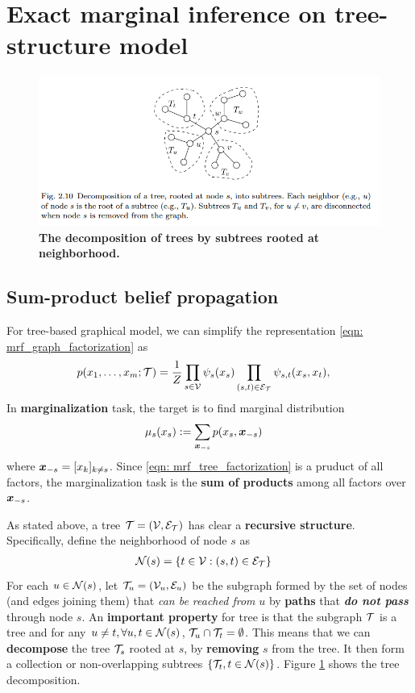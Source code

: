 \documentclass[11pt]{article}
\begin{document}
\section{Exact marginal inference on tree-structure model}
\begin{figure}
\begin{minipage}[t]{1\linewidth}
  \centering
  \centerline{\includegraphics[scale = 0.5]{tree_decomp.png}}
\end{minipage}
\caption{\footnotesize{\textbf{The decomposition of trees by subtrees rooted at neighborhood.}}}
\label{fig: tree_decomp}
\end{figure}
\subsection{Sum-product belief propagation}
For tree-based graphical model, we can simplify the representation \eqref{eqn: mrf_graph_factorization} as
\begin{align}
p(x_1, \ldots, x_{m}; {\mathcal T}) &= \frac{1}{Z}\prod_{s\in {\mathcal V}}\psi_{s}(x_{s})\prod_{(s,t) \in {\mathcal E}_{{\mathcal T}}}\psi_{s,t}(x_{s}, x_{t}), \label{eqn: mrf_tree_factorization}
\end{align} In \textbf{marginalization} task, the target is to find marginal distribution
\begin{align}
\mu_{s}(x_{s}) &:= \sum_{\boldsymbol{x}_{-s}}p(x_s, \boldsymbol{x}_{-s}) \label{eqn: mrf_tree_marginal}
\end{align} where $\boldsymbol{x}_{-s} = [x_k]_{k\neq s}$. Since \eqref{eqn: mrf_tree_factorization} is a pruduct of all factors, the marginalization task is the \textbf{sum of products} among all factors over $\boldsymbol{x}_{-s}$.


As stated above, a tree ${\mathcal T} = ({\mathcal V}, {\mathcal E}_{{\mathcal T}})$ has clear a \textbf{recursive structure}. Specifically, define the neighborhood of node $s$ as
\begin{align*}
{\mathcal N}(s) &= \left\{t\in {\mathcal V}: (s,t) \in {\mathcal E}_{{\mathcal T}} \right\}
\end{align*} For each $u \in {\mathcal N}(s)$, let ${\mathcal T}_u = ({\mathcal V}_u, {\mathcal E}_u)$ be the subgraph formed by the set of nodes (and edges joining them) that \emph{can be reached from} $u$ by \textbf{paths} that \emph{\textbf{do not pass}} through node $s$. An \textbf{important property} for tree is that the subgraph ${\mathcal T}$ is a tree and  for any $u\neq t,  \forall u,t \in {\mathcal N}(s)$, ${\mathcal T}_{u} \cap {\mathcal T}_{t} = \emptyset$.  This means that we can \textbf{decompose} the tree ${\mathcal T}_{s}$ rooted at $s$, by \textbf{removing} $s$ from the tree. It then form a collection or non-overlapping subtrees $\{{\mathcal T}_t, t \in {\mathcal N}(s)\}$. Figure \ref{fig: tree_decomp} shows the tree decomposition. 
\end{document}
